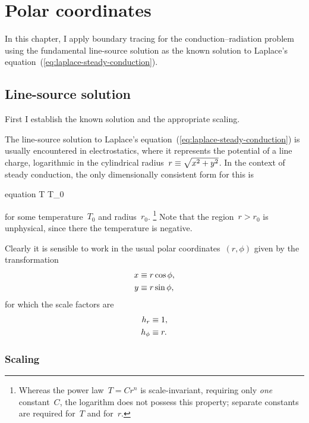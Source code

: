 \chapter{Polar coordinates}
\label{ch:polar}

In this chapter,
I apply boundary tracing for the conduction--radiation problem
using the fundamental line-source solution
as the known solution to
Laplace's equation~(\ref{eq:laplace-steady-conduction}).

\section{Line-source solution}
\label{sec:polar.line}

First I establish the known solution and the appropriate scaling.

The line-source solution
to Laplace's equation~(\ref{eq:laplace-steady-conduction})
is usually encountered in electrostatics,
where it represents the potential of a line charge,
logarithmic in the cylindrical radius~$r \equiv \sqrt{x^2 + y^2}$.
In the context of steady conduction,
the only dimensionally consistent form for this is
\begin{important}{equation}
  T \ideq T_0 \log {}
  \label{eq:line-laplace-solution}
\end{important}
for some temperature~$T_0$ and radius~$r_0$.%
\footnote{
  Whereas the power law~$T = C r^n$ is scale-invariant,
  requiring only \emph{one} constant~$C$,
  the logarithm does not possess this property;
  separate constants are required for~$T$ and for~$r$.
}
Note that the region~$r > r_0$ is unphysical,
since there the temperature is negative.

Clearly it is sensible to work in the usual polar coordinates~$(r, \phi)$
given by the transformation
\begin{align}
  x &\equiv r \cos\phi, \label{eq:x-transformation-polar} \\
  y &\equiv r \sin\phi, \label{eq:y-transformation-polar}
\end{align}
for which the scale factors are
\begin{align}
  \scalefac[r] &\ideq 1, \label{eq:r-scale-factor-polar} \\
  \scalefac[\phi] &\ideq r. \label{eq:phi-scale-factor-polar}
\end{align}

\subsection{Scaling}
\label{sec:polar.line.scaling}

